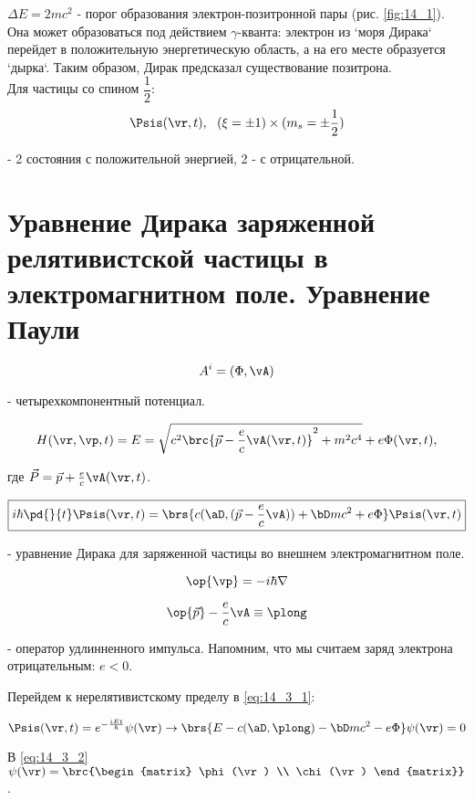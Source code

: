 $\Delta E = 2mc^2$ - порог образования электрон-позитронной пары (рис. \eqref{fig:14_1}). Она может образоваться под действием $\gamma$-кванта: электрон из `моря Дирака` перейдет в положительную энергетическую область, а на его месте образуется `дырка`. Таким образом, Дирак предсказал существование позитрона. \\

Для частицы со спином $\dfrac{1}{2}$:
$$
\Psis(\vr, t), ~~(\xi = \pm 1) \times (m_s = \pm \frac{1}{2})
$$

- 2 состояния с положительной энергией, 2 - с отрицательной. 

\begin{sloppypar}
\section{Уравнение Дирака заряженной релятивистской частицы в электромагнитном поле. Уравнение Паули}
\end{sloppypar}

$$
A^i=(\Phi, \vA)
$$

- четырехкомпонентный потенциал.

$$
H(\vr, \vp, t) = E = \sqrt{c^2\brc{\vec{p} - \frac{e}{c}\vA(\vr, t)}^2 + m^2c^4 } + e\Phi(\vr, t),
$$

где $\vec{P} = \vec{p} + \frac{e}{c}\vA(\vr, t)$.

\begin{equation}
\label{eq:14_3_1}
\boxed{i \hbar \pd{}{t} \Psis(\vr, t) = \brs{c(\aD, (\vec{p} - \frac{e}{c} \vA)) + \bD mc^2 + e\Phi} \Psis(\vr, t)}
\end{equation}

- уравнение Дирака для заряженной частицы во внешнем электромагнитном поле.

$$
\op{\vp} = - i \hbar \nabla
$$

$$
\op{\vec{p}} - \frac{e}{c} \vA \equiv \plong 
$$

- оператор удлинненного импульса. Напомним, что мы считаем заряд электрона отрицательным: $e < 0$.

Перейдем к нерелятивистскому пределу в \eqref{eq:14_3_1}:

\begin{equation}
\label{eq:14_3_2}
\Psis(\vr, t) = e^{-\frac{iEt}{\hbar}} \psi(\vr) \to \brs{E - c(\aD, \plong) - \bD mc^2 - e\Phi} \psi(\vr) = 0
\end{equation}

 В \eqref{eq:14_3_2} $\psi(\vr) = \brc{\begin{matrix} \phi(\vr) \\ \chi(\vr) \end{matrix}}$.
 
